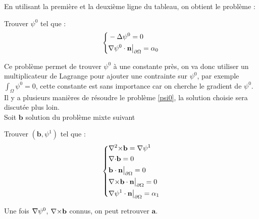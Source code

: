 En utilisant la première et la deuxième ligne du tableau, on obtient le problème :
\begin{pb}\label{psi0}
Trouver $\psi^0$ tel que :
\begin{equation*}
\left\{\begin{aligned}
&-{\Delta}\psi^0 = 0\\
&{\nabla}\psi^0\cdot \mathbf{n}{\big\rvert_{\partial\Omega}}=\alpha_0
\end{aligned}\right.
\end{equation*}\end{pb}
Ce problème permet de trouver $\psi^0$ à une constante près, on va donc utiliser un multiplicateur de Lagrange pour ajouter une contrainte sur $\psi^0$, par exemple $\int_\Omega \psi^0 = 0$, cette constante est sans importance car on cherche le gradient de $\psi^0$.\\
Il y a plusieurs manières de résoudre le problème \ref{psi0}, la solution choisie sera discutée plus loin.\\

Soit $\mathbf{b}$ solution du problème mixte suivant
\begin{pb}\label{curlb}
Trouver $(\mathbf{b},\psi^1)$ tel que :
\begin{equation*}
\left\{\begin{aligned}
&{\nabla^2\times} \mathbf{b} = {\nabla}\psi^1\\
&{\nabla\cdot} \mathbf{b} = 0\\
&\mathbf{b}\cdot \mathbf{n}{\big\rvert_{\partial\Omega}} = 0\\
&{\nabla\times} \mathbf{b}\cdot \mathbf{n}{\big\rvert_{\partial\Omega}} = 0\\
&{\nabla}\psi^1\cdot \mathbf{n}{\big\rvert_{\partial\Omega}} = \alpha_1
\end{aligned}\right.
\end{equation*}\end{pb}


Une fois ${\nabla}\psi^0$, ${\nabla\times} \mathbf{b}$ connus, on peut retrouver $\mathbf{a}$.\\

